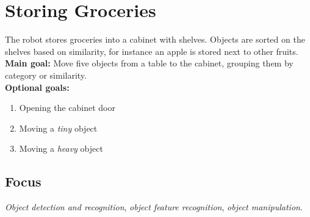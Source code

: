 \section{Storing Groceries}
\label{test:storing-groceries}
The robot stores groceries into a cabinet with shelves. Objects are sorted on the shelves based on similarity, for instance an apple is stored next to other fruits.\\

\noindent \textbf{Main goal:} Move five objects from a table to the cabinet, grouping them by category or similarity.\\

\noindent \textbf{Optional goals:}
\begin{enumerate}[nosep]
	\item Opening the cabinet door
	\item Moving a \emph{tiny} object
	\item Moving a \emph{heavy} object
\end{enumerate}

\subsection*{Focus}
\emph{Object detection and recognition}, \emph{object feature recognition}, \emph{object manipulation}.

